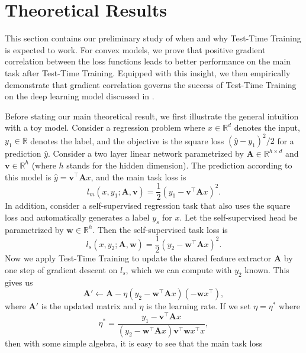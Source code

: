 \documentclass{article}
\theoremstyle{plain}
\theoremstyle{remark}
\theoremstyle{definition}
\def\vv{{\bm{v}}}
\def\vw{{\bm{w}}}
\def\mA{{\bm{A}}}
\newcommand{\R}{\mathbb{R}}
\begin{document}
\section{Theoretical Results}
\label{theory}
This section contains our preliminary study of when and why Test-Time Training is expected to work.
For convex models, we prove that positive gradient correlation between the loss functions leads to better performance on the main task after Test-Time Training.
Equipped with this insight, we then empirically
demonstrate that gradient correlation governs the success of Test-Time Training on the deep learning model discussed in .

Before stating our main theoretical result, we first illustrate the general intuition with a toy model.
Consider a regression problem where $x\in\R^d$ denotes the input,  $y_1\in\R$ denotes the label, and the objective is the square loss
$(\hat{y}-y_1)^2/2$ for a prediction $\hat{y}$.  
Consider a two layer linear network parametrized by $\mA\in\R^{h\times d}$ and $\vv \in\R^h$ (where $h$
stands for the hidden dimension).  
The prediction according to this model
is $\hat{y}=\vv^\top \mA x$, and the main task loss is
\begin{equation}
    l_m(x, y_1; \mA, \vv) = \frac{1}{2}\left(y_1 - \vv^ \top \mA x\right)^2.
\end{equation}
In addition, consider a self-supervised regression task that also uses the square loss and automatically generates a label $y_s$ for $x$. 
Let the self-supervised head be parametrized by $\vw\in\R^h$.  Then the self-supervised task loss is
\begin{equation}
    l_s(x, y_2; \mA, \vw) = \frac{1}{2}\left(y_2 - \vw^\top\mA x\right)^2.
\end{equation}
Now we apply Test-Time Training to update the shared feature extractor $\mA$ by
one step of gradient descent on $l_s$, which we can compute with $y_2$ known.
This gives us
\begin{equation}
    \mA' \leftarrow \mA - \eta\left( y_2-\vw^\top\mA x \right) \left(-\vw x^\top\right),
\end{equation}
where $\mA'$ is the updated matrix and $\eta$ is the learning rate.
If we set $\eta = \eta^*$ where
\begin{equation}
\label{magic_lr}
\eta^* = \frac{y_1 - \vv^\top \mA x}{\left( y_2 - \vw^\top \mA x \right)
	\vv^\top \vw x^\top x},
\end{equation}
then with some simple algebra, it is easy to see that the main task loss 
\end{document}

